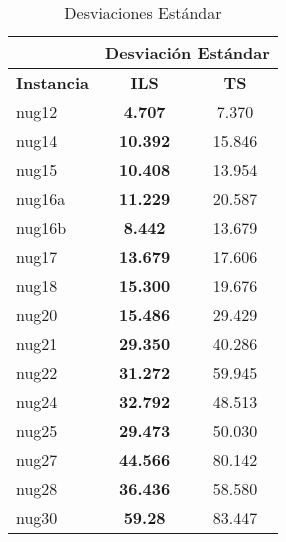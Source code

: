 \documentclass{ci5652}
\begin{document}
\begin{table}[ht]
	\label{table:sd}
    \caption{Desviaciones Estándar}
    \centering
	\begin{tabular}{l|c|c|}
\cline{2-3}
                                      & \multicolumn{2}{c|}{{\bf Desviación Estándar}} \\ \hline
\multicolumn{1}{|l|}{{\bf Instancia}} & {\bf ILS}                & {\bf TS}            \\ \hline
\multicolumn{1}{|l|}{nug12}           & {\bf 4.707}              & 7.370               \\ \hline
\multicolumn{1}{|l|}{nug14}           & {\bf 10.392}             & 15.846              \\ \hline
\multicolumn{1}{|l|}{nug15}           & {\bf 10.408}             & 13.954              \\ \hline
\multicolumn{1}{|l|}{nug16a}          & {\bf 11.229}             & 20.587              \\ \hline
\multicolumn{1}{|l|}{nug16b}          & {\bf 8.442}              & 13.679              \\ \hline
\multicolumn{1}{|l|}{nug17}           & {\bf 13.679}             & 17.606              \\ \hline
\multicolumn{1}{|l|}{nug18}           & {\bf 15.300}             & 19.676              \\ \hline
\multicolumn{1}{|l|}{nug20}           & {\bf 15.486}             & 29.429              \\ \hline
\multicolumn{1}{|l|}{nug21}           & {\bf 29.350}             & 40.286              \\ \hline
\multicolumn{1}{|l|}{nug22}           & {\bf 31.272}             & 59.945              \\ \hline
\multicolumn{1}{|l|}{nug24}           & {\bf 32.792}             & 48.513              \\ \hline
\multicolumn{1}{|l|}{nug25}           & {\bf 29.473}             & 50.030              \\ \hline
\multicolumn{1}{|l|}{nug27}           & {\bf 44.566}             & 80.142              \\ \hline
\multicolumn{1}{|l|}{nug28}           & {\bf 36.436}             & 58.580              \\ \hline
\multicolumn{1}{|l|}{nug30}           & {\bf 59.28}              & 83.447              \\ \hline
\end{tabular}
\end{table}
\end{document}

